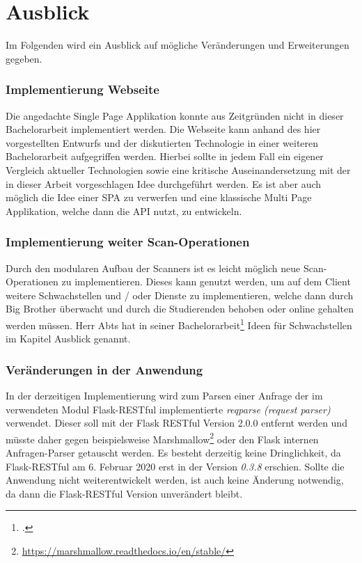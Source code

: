 \section{Ausblick}
Im Folgenden wird ein Ausblick auf mögliche Veränderungen und Erweiterungen gegeben.

\subsubsection{Implementierung Webseite}
Die angedachte Single Page Applikation konnte aus Zeitgründen nicht in dieser Bachelorarbeit implementiert werden. Die Webseite kann anhand des hier vorgestellten Entwurfs und der diskutierten Technologie in einer weiteren Bachelorarbeit aufgegriffen werden. Hierbei sollte in jedem Fall ein eigener Vergleich aktueller Technologien sowie eine kritische Auseinandersetzung mit der in dieser Arbeit vorgeschlagen Idee durchgeführt werden. Es ist aber auch möglich die Idee einer SPA zu verwerfen und eine klassische Multi Page Applikation, welche dann die API nutzt, zu entwickeln.

\subsubsection{Implementierung weiter Scan-Operationen}
Durch den modularen Aufbau der Scanners ist es leicht möglich neue Scan-Operationen zu implementieren. Dieses kann genutzt werden, um auf dem Client weitere Schwachstellen und / oder Dienste zu implementieren, welche dann durch Big Brother überwacht und durch die Studierenden behoben oder online gehalten werden müssen. Herr Abts hat in seiner Bachelorarbeit\footcite{abtsUeberarbeitungUndErweiterung2016} Ideen für Schwachstellen im Kapitel Ausblick genannt. 

\subsubsection{Veränderungen in der Anwendung}
In der derzeitigen Implementierung wird zum Parsen einer Anfrage der im verwendeten Modul Flask-RESTful implementierte \textit{reqparse (request parser)} verwendet. Dieser soll mit der Flask RESTful Version 2.0.0 entfernt werden und müsste daher gegen beispielsweise Marshmallow\footnote{\url{https://marshmallow.readthedocs.io/en/stable/}} oder den Flask internen Anfragen-Parser getauscht werden. Es besteht derzeitig keine Dringlichkeit, da Flask-RESTful am 6. Februar 2020 erst in der Version \textit{0.3.8} erschien. Sollte die Anwendung nicht weiterentwickelt werden, ist auch keine Änderung notwendig, da dann die Flask-RESTful Version unverändert bleibt.

